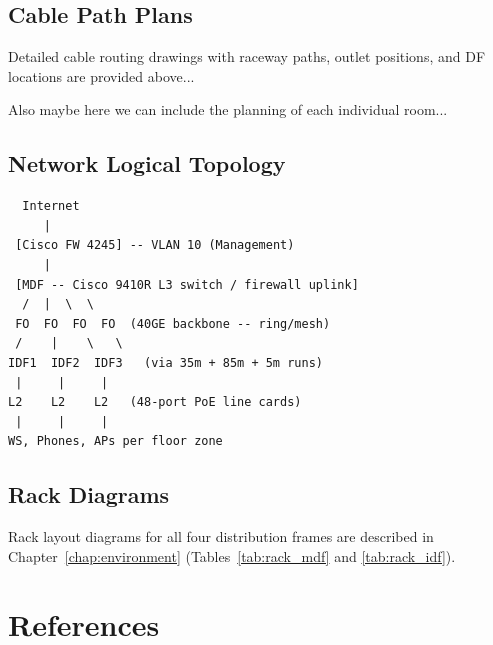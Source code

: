 \documentclass[12pt,a4paper]{report}
\begin{document}
\section{Cable Path Plans}

Detailed cable routing drawings with raceway paths, outlet positions,
and DF locations are provided above...

Also maybe here we can include the planning of each individual room...

\section{Network Logical Topology}

\begin{verbatim}
  Internet
     |
 [Cisco FW 4245] -- VLAN 10 (Management)
     |
 [MDF -- Cisco 9410R L3 switch / firewall uplink]
  /  |  \  \
 FO  FO  FO  FO  (40GE backbone -- ring/mesh)
 /    |    \   \
IDF1  IDF2  IDF3   (via 35m + 85m + 5m runs)
 |     |     |
L2    L2    L2   (48-port PoE line cards)
 |     |     |
WS, Phones, APs per floor zone
\end{verbatim}

\section{Rack Diagrams}

Rack layout diagrams for all four distribution frames are described in
Chapter~\ref{chap:environment} (Tables~\ref{tab:rack_mdf} and \ref{tab:rack_idf}).

\chapter{References}
\end{document}
